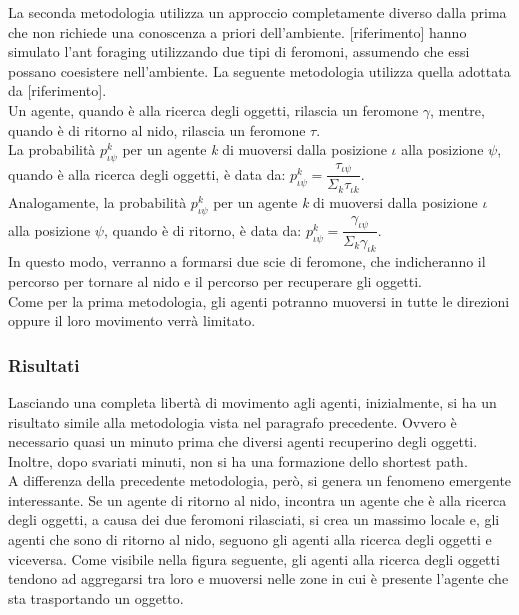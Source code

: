 \documentclass[12pt,a4paper,openright,twoside]{report}
\begin{document}
La seconda metodologia utilizza un approccio completamente diverso dalla prima che non richiede una conoscenza a priori dell'ambiente. [riferimento] hanno simulato l'ant foraging utilizzando due tipi di feromoni, assumendo che essi possano coesistere nell'ambiente. La seguente metodologia utilizza quella adottata da [riferimento].\\
Un agente, quando è alla ricerca degli oggetti, rilascia un feromone $\gamma$, mentre, quando è di ritorno al nido, rilascia un feromone $\tau$.\\
La probabilità $p^k_{\iota\psi}$ per un agente \textit{k} di muoversi dalla posizione $\iota$ alla posizione $\psi$, quando è alla ricerca degli oggetti, è data da: $p^k_{\iota\psi}= \dfrac{\tau_{\iota\psi}}{\Sigma_k\tau_{\iota k}}$.\\
Analogamente, la probabilità $p^k_{\iota\psi}$ per un agente \textit{k} di muoversi dalla posizione $\iota$ alla posizione $\psi$, quando è di ritorno, è data da: $p^k_{\iota\psi}= \dfrac{\gamma_{\iota\psi}}{\Sigma_k\gamma_{\iota k}}$.\\
In questo modo, verranno a formarsi due scie di feromone, che indicheranno il percorso per tornare al nido e il percorso per recuperare gli oggetti.\\
Come per la prima metodologia, gli agenti potranno muoversi in tutte le direzioni oppure il loro movimento verrà limitato.\\

\subsubsection{Risultati}

Lasciando una completa libertà di movimento agli agenti, inizialmente, si ha un risultato simile alla metodologia vista nel paragrafo precedente. Ovvero è necessario quasi un minuto prima che diversi agenti recuperino degli oggetti. Inoltre, dopo svariati minuti, non si ha una formazione dello shortest path.
\\A differenza della precedente metodologia, però, si genera un fenomeno emergente interessante. Se un agente di ritorno al nido, incontra un agente che è alla ricerca degli oggetti, a causa dei due feromoni rilasciati, si crea un massimo locale e, gli agenti che sono di ritorno al nido, seguono gli agenti alla ricerca degli oggetti e viceversa. Come visibile nella figura seguente, gli agenti alla ricerca degli oggetti tendono ad aggregarsi tra loro e muoversi nelle zone in cui è presente l'agente che sta trasportando un oggetto.\\
\end{document}
